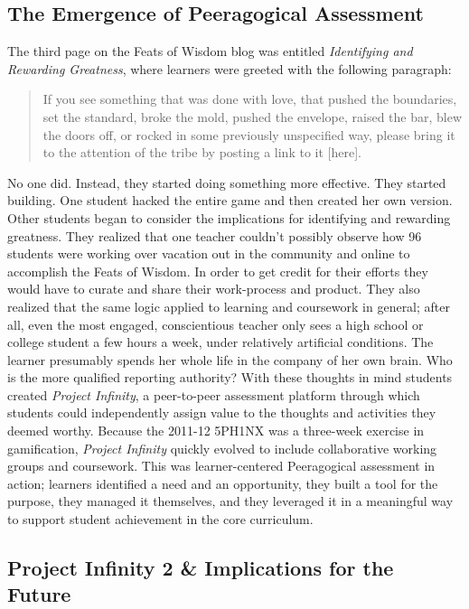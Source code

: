 \subsection{The Emergence of Peeragogical Assessment}

The third page on the Feats of Wisdom blog was entitled
\emph{Identifying and Rewarding Greatness}, where learners were greeted
with the following paragraph:

\begin{quote}
If you see something that was done with love, that pushed the
boundaries, set the standard, broke the mold, pushed the envelope,
raised the bar, blew the doors off, or rocked in some previously
unspecified way, please bring it to the attention of the tribe by
posting a link to it {[}here{]}.
\end{quote}
No one did. Instead, they started doing something more effective. They
started building. One student hacked the entire game and then created
her own version. Other students began to consider the implications for
identifying and rewarding greatness. They realized that one teacher
couldn't possibly observe how 96 students were working over vacation out
in the community and online to accomplish the Feats of Wisdom. In order
to get credit for their efforts they would have to curate and share
their work-process and product. They also realized that the same logic
applied to learning and coursework in general; after all, even the most
engaged, conscientious teacher only sees a high school or college
student a few hours a week, under relatively artificial conditions. The
learner presumably spends her whole life in the company of her own
brain. Who is the more qualified reporting authority? With these
thoughts in mind students created \emph{Project Infinity}, a
peer-to-peer assessment platform through which students could
independently assign value to the thoughts and activities they deemed
worthy. Because the 2011-12 5PH1NX was a three-week exercise in
gamification, \emph{Project Infinity} quickly evolved to include
collaborative working groups and coursework. This was learner-centered
Peeragogical assessment in action; learners identified a need and an
opportunity, they built a tool for the purpose, they managed it
themselves, and they leveraged it in a meaningful way to support student
achievement in the core curriculum.

\subsection{Project Infinity 2 \& Implications for the Future}

